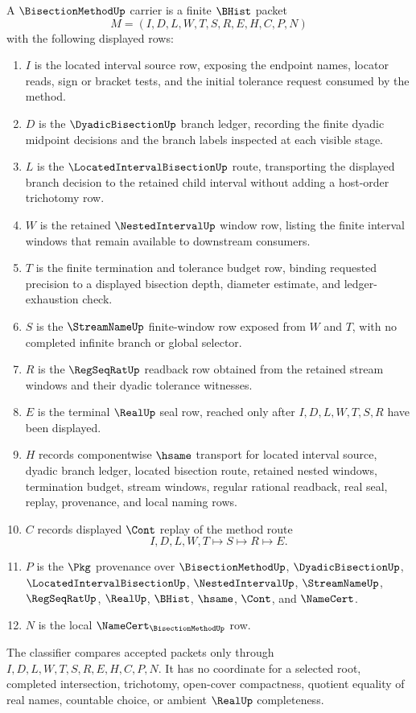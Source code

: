 \begin{definition}
\label{def:bisection-method-carrier}
A $\BisectionMethodUp$ carrier is a finite $\BHist$ packet
$$
M=(I,D,L,W,T,S,R,E,H,C,P,N)
$$
with the following displayed rows:
\begin{enumerate}
\item $I$ is the located interval source row, exposing the endpoint names, locator reads, sign or bracket tests, and the initial tolerance request consumed by the method.
\item $D$ is the $\DyadicBisectionUp$ branch ledger, recording the finite dyadic midpoint decisions and the branch labels inspected at each visible stage.
\item $L$ is the $\LocatedIntervalBisectionUp$ route, transporting the displayed branch decision to the retained child interval without adding a host-order trichotomy row.
\item $W$ is the retained $\NestedIntervalUp$ window row, listing the finite interval windows that remain available to downstream consumers.
\item $T$ is the finite termination and tolerance budget row, binding requested precision to a displayed bisection depth, diameter estimate, and ledger-exhaustion check.
\item $S$ is the $\StreamNameUp$ finite-window row exposed from $W$ and $T$, with no completed infinite branch or global selector.
\item $R$ is the $\RegSeqRatUp$ readback row obtained from the retained stream windows and their dyadic tolerance witnesses.
\item $E$ is the terminal $\RealUp$ seal row, reached only after $I,D,L,W,T,S,R$ have been displayed.
\item $H$ records componentwise $\hsame$ transport for located interval source, dyadic branch ledger, located bisection route, retained nested windows, termination budget, stream windows, regular rational readback, real seal, replay, provenance, and local naming rows.
\item $C$ records displayed $\Cont$ replay of the method route
$$
I,D,L,W,T \longmapsto S \longmapsto R \longmapsto E .
$$
\item $P$ is the $\Pkg$ provenance over $\BisectionMethodUp$, $\DyadicBisectionUp$, $\LocatedIntervalBisectionUp$, $\NestedIntervalUp$, $\StreamNameUp$, $\RegSeqRatUp$, $\RealUp$, $\BHist$, $\hsame$, $\Cont$, and $\NameCert$.
\item $N$ is the local $\NameCert_{\BisectionMethodUp}$ row.
\end{enumerate}
The classifier compares accepted packets only through $I,D,L,W,T,S,R,E,H,C,P,N$. It has no coordinate for a selected root, completed intersection, trichotomy, open-cover compactness, quotient equality of real names, countable choice, or ambient $\RealUp$ completeness.
\end{definition}

